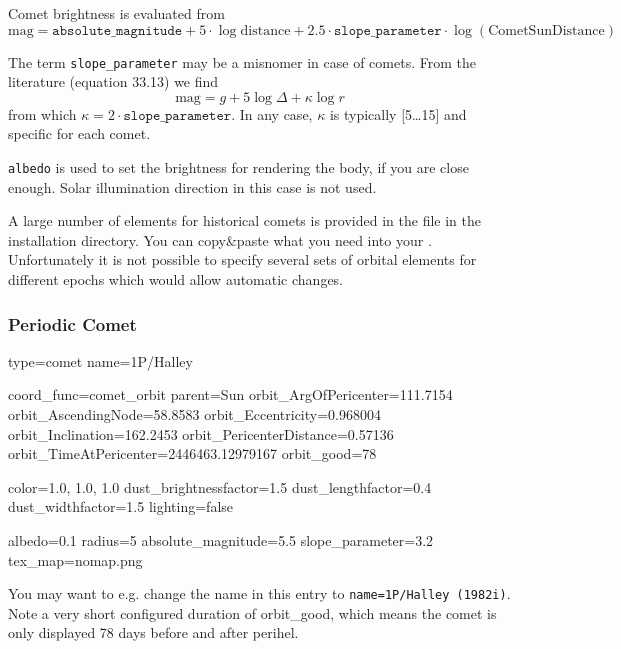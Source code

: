 Comet brightness is evaluated from
\begin{equation}
  \label{eq:comet_magnitudes}
  \mathrm{mag}=\mathtt{absolute\_magnitude}+5\cdot\log{\mathrm{distance}} + 2.5\cdot\mathtt{slope\_parameter}\cdot\log(\mathrm{CometSunDistance})
\end{equation}

The term \texttt{slope\_parameter} may be a misnomer in case of
comets. From the literature \cite{AstronomicalAlgorithms:1998} (equation 33.13) we find
\begin{equation}
  \label{eq:comet_magnitudes_Meeus}
  \mathrm{mag}=g+5\log\Delta + \kappa\log r
\end{equation}
from which $\kappa=2\cdot\mathtt{slope\_parameter}$. In any case, $\kappa$ is typically [5\ldots15] and specific for each comet.

\texttt{albedo} is used to set the brightness for rendering the body,
if you are close enough. Solar illumination direction in this case is
not used.

A large number of elements for historical comets is provided in the
file  in the installation directory. You
can copy\&paste what you need into your
. Unfortunately it is not possible to specify
several sets of orbital elements for different epochs which would
allow automatic changes.

\subsubsection{Periodic Comet}
\label{sec:ssystem.ini:Comet:Periodic}

\begin{configfile}
[1phalley]
type=comet  
name=1P/Halley

coord_func=comet_orbit
parent=Sun
orbit_ArgOfPericenter=111.7154
orbit_AscendingNode=58.8583
orbit_Eccentricity=0.968004
orbit_Inclination=162.2453
orbit_PericenterDistance=0.57136
orbit_TimeAtPericenter=2446463.12979167
orbit_good=78

color=1.0, 1.0, 1.0
dust_brightnessfactor=1.5
dust_lengthfactor=0.4
dust_widthfactor=1.5
lighting=false

albedo=0.1
radius=5
absolute_magnitude=5.5
slope_parameter=3.2
tex_map=nomap.png
\end{configfile}

You may want to e.g. change the name in this entry
to \texttt{name=1P/Halley (1982i)}. Note a very short configured
duration of orbit\_good, which means the comet is only displayed 78
days before and after perihel.


